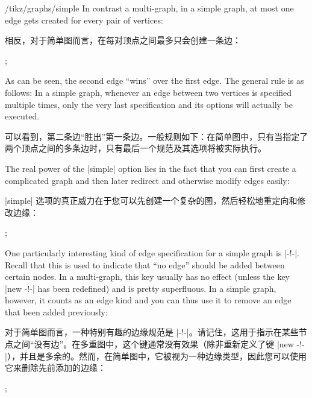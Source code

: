 \begin{key}{/tikz/graphs/simple}
    In contrast a multi-graph, in a simple graph, at most one edge gets created
    for every pair of vertices:
    
    相反，对于简单图而言，在每对顶点之间最多只会创建一条边：%
\begin{codeexample}[preamble={\usetikzlibrary{graphs}}]
\tikz {};
\end{codeexample}
    As can be seen, the second edge ``wins'' over the first edge. The general
    rule is as follows: In a simple graph, whenever an edge between two
    vertices is specified multiple times, only the very last specification and
    its options will actually be executed.

    可以看到，第二条边“胜出”第一条边。一般规则如下：在简单图中，只有当指定了两个顶点之间的多条边时，只有最后一个规范及其选项将被实际执行。


    The real power of the |simple| option lies in the fact that you can first
    create a complicated graph and then later redirect and otherwise modify
    edges easily:
    
    |simple| 选项的真正威力在于您可以先创建一个复杂的图，然后轻松地重定向和修改边缘：

\begin{codeexample}[preamble={\usetikzlibrary{graphs}}]
\tikz {};
\end{codeexample}

    One particularly interesting kind of edge specification for a simple graph
    is |-!-|. Recall that this is used to indicate that ``no edge'' should be
    added between certain nodes. In a multi-graph, this key usually has no
    effect (unless the key |new -!-| has been redefined) and is pretty
    superfluous. In a simple graph, however, it counts as an edge kind and you
    can thus use it to remove an edge that been added previously:
    
    对于简单图而言，一种特别有趣的边缘规范是 |-!-|。请记住，这用于指示在某些节点之间“没有边”。在多重图中，这个键通常没有效果（除非重新定义了键 |new -!-|），并且是多余的。然而，在简单图中，它被视为一种边缘类型，因此您可以使用它来删除先前添加的边缘：


\begin{codeexample}[preamble={\usetikzlibrary{graphs.standard}}]
\tikz {};
\end{codeexample}


\end{key}
